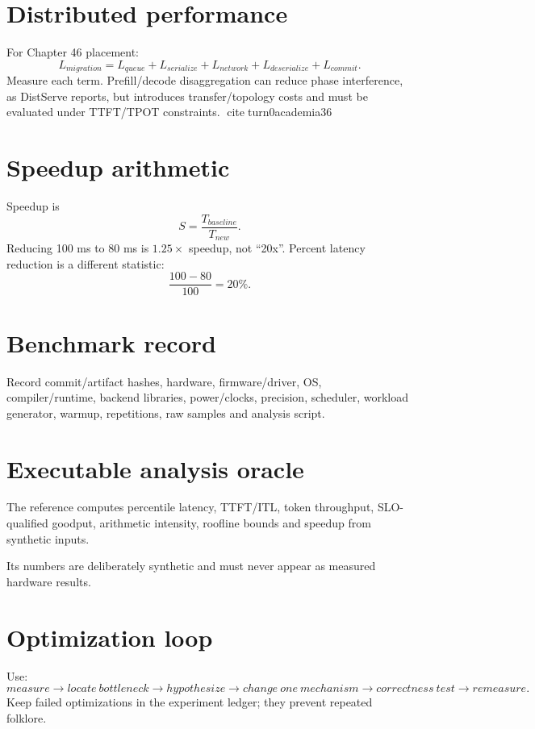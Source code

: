 \section{Distributed performance}
For Chapter 46 placement:
\[
L_{migration}=L_{queue}+L_{serialize}+L_{network}+L_{deserialize}+L_{commit}.
\]
Measure each term. Prefill/decode disaggregation can reduce phase interference, as DistServe reports, but introduces transfer/topology costs and must be evaluated under TTFT/TPOT constraints. citeturn0academia36

\section{Speedup arithmetic}
Speedup is
\[
S=\frac{T_{baseline}}{T_{new}}.
\]
Reducing 100 ms to 80 ms is $1.25\times$ speedup, not ``20x''. Percent latency reduction is a different statistic:
\[
\frac{100-80}{100}=20\%.
\]

\section{Benchmark record}
Record commit/artifact hashes, hardware, firmware/driver, OS, compiler/runtime, backend libraries, power/clocks, precision, scheduler, workload generator, warmup, repetitions, raw samples and analysis script.

\section{Executable analysis oracle}
The reference computes percentile latency, TTFT/ITL, token throughput, SLO-qualified goodput, arithmetic intensity, roofline bounds and speedup from synthetic inputs.

Its numbers are deliberately synthetic and must never appear as measured hardware results.

\section{Optimization loop}
Use:
\[
measure\rightarrow locate\ bottleneck\rightarrow hypothesize\rightarrow
change\ one\ mechanism\rightarrow correctness\ test\rightarrow remeasure.
\]
Keep failed optimizations in the experiment ledger; they prevent repeated folklore.

